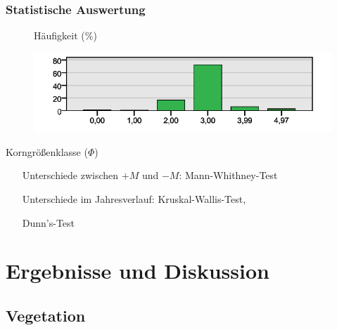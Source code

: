 \documentclass{beamer}
\begin{document}
\begin{frame}[t]
\frametitle{Statistische Auswertung}
\begin{figure}
\begin{flushleft}
Häufigkeit (\%)
\end{flushleft}
\includegraphics[height=30mm]{images/Fotos/bsp_kornverteilung.png}
\vspace*{-0.76cm}
\end{figure}
\begin{flushright}
Korngrößenklasse ($ \Phi $)
\end{flushright}
\begin{itemize}
\setlength{\itemindent}{+5.5cm} 
\item[Unterschiede zwischen $ +M $ und $ -M $:] Mann-Whithney-Test
\item[Unterschiede im Jahresverlauf:] Kruskal-Wallis-Test, 
\item[] Dunn's-Test 
\end{itemize}
\end{frame}


\section{Ergebnisse und Diskussion}
\subsection{Vegetation}
\end{document}
